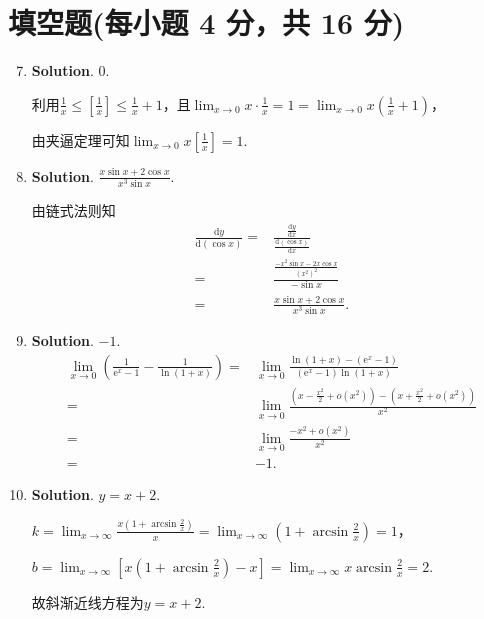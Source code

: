 \documentclass[../Main.tex]{subfiles}
\begin{document}
\section{填空题(每小题 4 分，共 16 分)}
\begin{enumerate}
    \setcounter{enumi}{6}
    \item \textbf{Solution}. $0$.

          利用$\frac{1}{x}\leq\left[\frac{1}{x}\right]\leq\frac{1}{x}+1$，且$\lim_{x\to0}
              x\cdot\frac{1}{x}=1=\lim_{x\to0}x\left(\frac{1}{x}+1\right)$，

          由夹逼定理可知$\lim_{x\to0}x\left[\frac{1}{x}\right]=1$.

    \item \textbf{Solution}. $\frac{x\sin x+2\cos x}{x^{3}\sin x}$.

          由链式法则知
          \[
              \begin{aligned}
                  \frac{\mathrm{d}y}{\mathrm{d}(\cos x)} = & \frac{\frac{\mathrm{d}y}{\mathrm{d}x}}{\frac{\mathrm{d}(\cos x)}{\mathrm{d}x}} \\
                  =                                        & \frac{\frac{-x^{2}\sin x - 2x\cos x}{(x^{2})^{2}}}{-\sin x}                    \\
                  =                                        & \frac{x\sin x+2\cos x}{x^{3}\sin x}.
              \end{aligned}
          \]

    \item \textbf{Solution}. $-1$.
          \[
              \begin{aligned}
                  \lim_{x\to0}\left(\frac{1}{\mathrm{e}^x-1}-\frac{1}{\ln(1+x)}\right) = & \lim_{x\to0}\frac{\ln(1+x)-(\mathrm{e}^x-1)}{(\mathrm{e}^x-1)\ln(1+x)}                          \\
                  =                                                                      & \lim_{x\to0}\frac{\left(x-\frac{x^2}{2}+o(x^2)\right)-\left(x+\frac{x^2}{2}+o(x^2)\right)}{x^2} \\
                  =                                                                      & \lim_{x\to0}\frac{-x^2+o(x^2)}{x^2}                                                             \\
                  =                                                                      & -1.
              \end{aligned}
          \]

    \item \textbf{Solution}. $y=x+2$.

          $k=\lim_{x\to\infty}\frac{x\left(1+\arcsin\frac{2}{x}\right)}{x}=\lim_{x\to\infty}
              \left(1+\arcsin\frac{2}{x}\right)=1$，

          $b=\lim_{x\to\infty}\left[x\left(1+\arcsin\frac{2}{x}\right)-x\right]=\lim_{x\to\infty}
              x\arcsin\frac{2}{x}=2$.

          故斜渐近线方程为$y=x+2$.
\end{enumerate}
\end{document}

